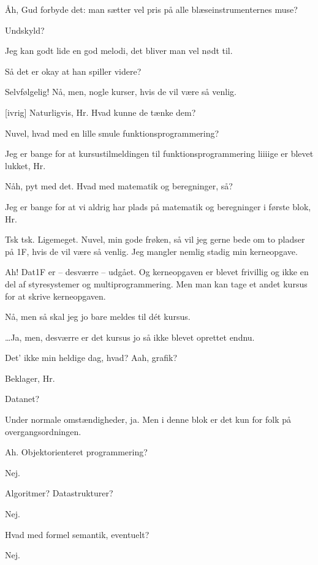 \documentclass[a4paper,11pt]{article}
\begin{document}
\begin{sketch}
   Åh, Gud forbyde det: man sætter vel pris på alle blæseinstrumenternes
  muse?

   Undskyld?

   Jeg kan godt lide en god melodi, det bliver man vel nødt til.

   Så det er okay at han spiller videre?

   Selvfølgelig! Nå, men, nogle kurser, hvis de vil være så venlig.

  [ivrig] Naturligvis, Hr. Hvad kunne de tænke dem?

   Nuvel, hvad med en lille smule funktionsprogrammering?

   Jeg er bange for at kursustilmeldingen til funktionsprogrammering
  liiiige er blevet lukket, Hr.

   Nåh, pyt med det. Hvad med matematik og beregninger, så?

   Jeg er bange for at vi aldrig har plads på matematik og beregninger i
  første blok, Hr.

   Tsk tsk. Ligemeget. Nuvel, min gode frøken, så vil jeg gerne bede om
  to pladser på 1F, hvis de vil være så venlig. Jeg mangler nemlig stadig min
  kerneopgave.

   Ah! Dat1F er -- desværre -- udgået.  Og kerneopgaven er
  blevet frivillig og ikke en del af styresystemer og multiprogrammering. Men man
  kan tage et andet kursus for at skrive kerneopgaven.

   Nå, men så skal jeg jo bare meldes til dét kursus.

   \ldots Ja, men, desværre er det kursus jo så ikke blevet oprettet
  endnu.

   Det' ikke min heldige dag, hvad? Aah, grafik?

   Beklager, Hr.

   Datanet?

   Under normale omstændigheder, ja. Men i denne blok er det kun for folk
  på overgangsordningen.

   Ah. Objektorienteret programmering?

   Nej.

   Algoritmer? Datastrukturer?

   Nej.

   Hvad med formel semantik, eventuelt?

   Nej.


\end{sketch}
\end{document}

